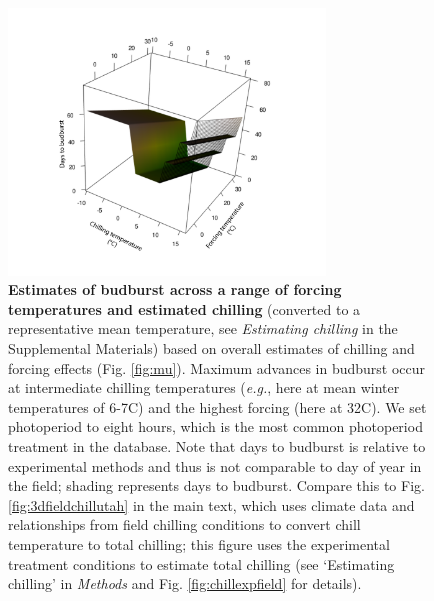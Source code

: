 \documentclass{article}
\begin{document}
 \begin{figure}[hp!]
 \centering
 \noindent \includegraphics[width=0.75\textwidth]{..//..//analyses/bb_analysis/figures/bbmod_3dplot_utah.pdf}
 \caption{\textbf{Estimates of budburst across a range of forcing temperatures and estimated chilling} (converted to a representative mean temperature, see \emph{Estimating chilling} in the Supplemental Materials) based on overall estimates of chilling and forcing effects (Fig. \ref{fig:mu}). Maximum advances in budburst occur at intermediate chilling temperatures (\emph{e.g.}, here at mean winter temperatures of 6-7\degree C) and the highest forcing (here at 32\degree C). We set photoperiod to eight hours, which is the most common photoperiod treatment in the database. Note that days to budburst is relative to experimental methods and thus is not comparable to day of year in the field; shading represents days to budburst. Compare this to Fig. \ref{fig:3dfieldchillutah} in the main text, which uses climate data and relationships from field chilling conditions to convert chill temperature to total chilling; this figure uses the experimental treatment conditions to estimate total chilling (see `Estimating chilling' in \emph{Methods} and Fig. \ref{fig:chillexpfield} for details).} 
 \label{fig:3dexpchillutah}
 \end{figure}
 \newpage
\end{document}
